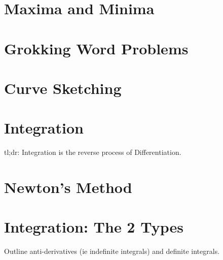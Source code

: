 \section{Maxima and Minima}
\label{sec:MaximaAndMinima}
\lipsum[1]
\section{Grokking Word Problems}
\label{sec:GrokkingWordProblems}
\lipsum[1]
\section{Curve Sketching}
\label{sec:CurveSketching}
\lipsum[1]
\section{Integration}
\label{sec:Integration}
tl;dr: Integration is the reverse process of Differentiation.
\section{Newton's Method}
\label{sec:NewtonsMethod}
\lipsum[1]
\section{Integration: The 2 Types}
\label{sec:IntegrationThe2Types}
Outline anti-derivatives (ie indefinite integrals) and definite integrals.
